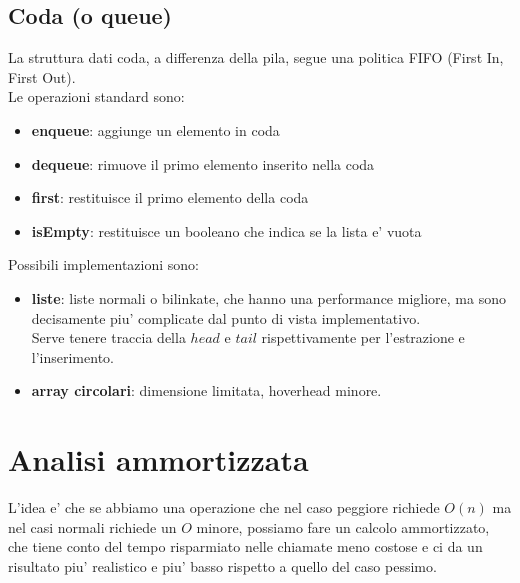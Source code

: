 \documentclass{article}
\begin{document}
\subsection{Coda (o queue)}

La struttura dati coda, a differenza della pila, segue una politica FIFO (First In, First Out). \\
Le operazioni standard sono:
\begin{itemize}
  \item \textbf{enqueue}: aggiunge un elemento in coda
  \item \textbf{dequeue}: rimuove il primo elemento inserito nella coda
  \item \textbf{first}: restituisce il primo elemento della coda
  \item \textbf{isEmpty}: restituisce un booleano che indica se la lista e' vuota
\end{itemize}

Possibili implementazioni sono:
\begin{itemize}
  \item \textbf{liste}: liste normali o bilinkate, che hanno una performance migliore,
    ma sono decisamente piu' complicate dal punto di vista implementativo. \\
    Serve tenere traccia della $head$ e $tail$ rispettivamente per l'estrazione e l'inserimento.
  \item \textbf{array circolari}: dimensione limitata, hoverhead minore.
\end{itemize}

\section{Analisi ammortizzata}

L'idea e' che se abbiamo una operazione che nel caso peggiore richiede $O(n)$ ma
nel casi normali richiede un $O$ minore, possiamo fare un calcolo ammortizzato,
che tiene conto del tempo risparmiato nelle chiamate meno costose e ci da un risultato
piu' realistico e piu' basso rispetto a quello del caso pessimo.
\end{document}
